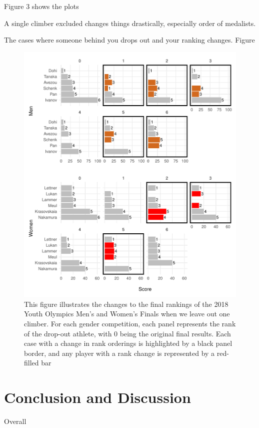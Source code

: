 \documentclass[12pt]{article}
\begin{document}
Figure 3 shows the plots

A single climber excluded changes things drastically, especially order
of medalists.

The cases where someone behind you drops out and your ranking changes.
Figure

\begin{figure}[H]
\centering
\includegraphics{draft_files/figure-latex/unnamed-chunk-12-1.pdf}
\caption{This figure illustrates the changes to the final rankings of
the 2018 Youth Olympics Men's and Women's Finals when we leave out one
climber. For each gender competition, each panel represents the rank of
the drop-out athlete, with 0 being the original final results. Each case
with a change in rank orderings is highlighted by a black panel border,
and any player with a rank change is represented by a red-filled bar}
\end{figure}

\hypertarget{conclusion-and-discussion}{%
\section{Conclusion and Discussion}\label{conclusion-and-discussion}}

Overall



\end{document}
